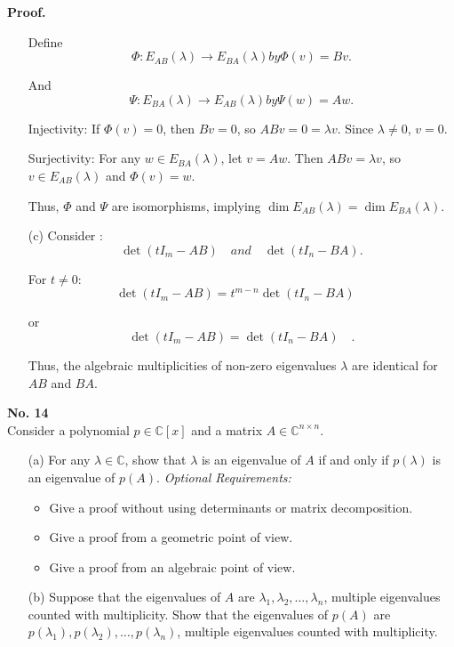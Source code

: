 \documentclass[a4paper, 11pt]{article}
\newenvironment{problem}[2][No.]
    { \begin{mdframed}[backgroundcolor=gray!5] \textbf{#1 #2} \\}
    {  \end{mdframed}}
\newenvironment{solution}
    {\textbf{Proof.}}
    {}
\begin{document}
\begin{solution}
\begin{enumerate}
	Define 
	$$ \Phi: E_{AB}(\lambda) \to E_{BA}(\lambda) by \Phi(v) = Bv .$$
	
	And $$\Psi: E_{BA}(\lambda) \to E_{AB}(\lambda) by \Psi(w) = Aw. $$
	
	Injectivity: If \(\Phi(v) = 0\), then \(Bv = 0\), so \(ABv = 0 = \lambda v\). Since \(\lambda \neq 0\), \(v = 0\).
	
	Surjectivity: For any \(w \in E_{BA}(\lambda)\), let \(v = Aw\). Then \(ABv = \lambda v\), so \(v \in E_{AB}(\lambda)\) and \(\Phi(v) = w\).
	
	Thus, \(\Phi\) and \(\Psi\) are isomorphisms, implying \(\dim E_{AB}(\lambda) = \dim E_{BA}(\lambda)\).
	
	
	\item[(c)]Consider :
$$
	\det(tI_m - AB) \quad and\quad \det(tI_n - BA).
$$

	For \(t \neq 0\):
$$
	\det(tI_m - AB) = t^{m - n} \det(tI_n - BA) \quad 
$$

	or
	$$
	\det(tI_m - AB) = \det(tI_n - BA) \quad .
$$

	Thus, the algebraic multiplicities of non-zero eigenvalues \(\lambda\) are identical for \(AB\) and \(BA\).
	\end{enumerate}

\end{solution}

\begin{problem}{14}
	Consider a polynomial \( p \in \mathbb{C}[x] \) and a matrix \( A \in \mathbb{C}^{n \times n} \).
	\begin{enumerate}
		\item[(a)] For any \( \lambda \in \mathbb{C} \), show that \( \lambda \) is an eigenvalue of \( A \) if and only if \( p(\lambda) \) is an eigenvalue of \( p(A) \).
		\textit{Optional Requirements:}
		\begin{itemize}
			\item Give a proof without using determinants or matrix decomposition.
			\item Give a proof from a geometric point of view.
			\item Give a proof from an algebraic point of view.
		\end{itemize}
		\item[(b)] Suppose that the eigenvalues of \( A \) are \( \lambda_1, \lambda_2, \ldots, \lambda_n \), multiple eigenvalues counted with multiplicity. Show that the eigenvalues of \( p(A) \) are \( p(\lambda_1), p(\lambda_2), \ldots, p(\lambda_n) \), multiple eigenvalues counted with multiplicity.
	\end{enumerate}
\end{problem}
\end{document}
